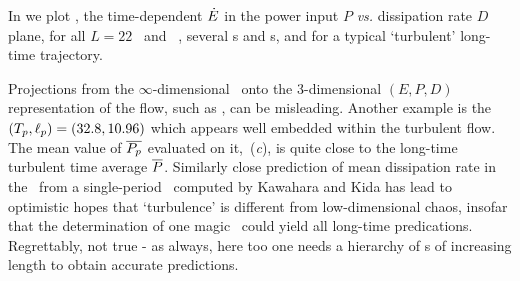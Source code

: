 In 
we plot , the time-dependent $\dot{E}$
in the
power input $P$ {\em vs.} %
dissipation rate $D$ %
plane, for all $L=22$ \eqva\ and
\reqva\ ,
several \po s and \rpo s, and for a typical `turbulent'
long-time trajectory.

Projections
from the $\infty$-dimensional \statesp\ onto
the 3-dimensional
$(E,P,D)$ representation of the flow, such as
,
can be misleading.
Another example is the \rpo\ $({T_{p}},\ell_p) =(32.8,10.96)$
which appears well embedded within the turbulent flow.
The mean value of $\overline{P_p}$
evaluated on it,
\,(\textit{c}),
is quite close to the long-time turbulent
time average $\overline{P}$.
Similarly close prediction of mean dissipation rate in the
\pCf\ from a single-period \po\ computed by
Kawahara and Kida has lead to
optimistic hopes that `turbulence' is different from
low-dimensional chaos, insofar that the determination of one
magic \po\ could yield all long-time predications.
Regrettably, not true - as always, here too one needs a hierarchy
of \po s of increasing length to obtain accurate
predictions.

